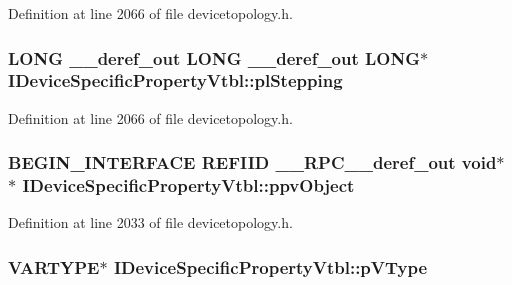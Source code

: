 Definition at line 2066 of file devicetopology.\+h.

\subsubsection[{\texorpdfstring{pl\+Stepping}{plStepping}}]{ L\+O\+NG {\bf \+\_\+\+\_\+deref\+\_\+out} L\+O\+NG {\bf \+\_\+\+\_\+deref\+\_\+out} L\+O\+NG$\ast$ I\+Device\+Specific\+Property\+Vtbl\+::pl\+Stepping}\hypertarget{struct_i_device_specific_property_vtbl_ac5505cba6d33acf434bb675cdc7840ec}{}\label{struct_i_device_specific_property_vtbl_ac5505cba6d33acf434bb675cdc7840ec}


Definition at line 2066 of file devicetopology.\+h.

\subsubsection[{\texorpdfstring{ppv\+Object}{ppvObject}}]{\setlength{\rightskip}{0pt plus 5cm}B\+E\+G\+I\+N\+\_\+\+I\+N\+T\+E\+R\+F\+A\+CE {\bf R\+E\+F\+I\+ID} {\bf \+\_\+\+\_\+\+R\+P\+C\+\_\+\+\_\+deref\+\_\+out} {\bf void}$\ast$$\ast$ I\+Device\+Specific\+Property\+Vtbl\+::ppv\+Object}\hypertarget{struct_i_device_specific_property_vtbl_a8047c290fd471a096e9f2761a630e471}{}\label{struct_i_device_specific_property_vtbl_a8047c290fd471a096e9f2761a630e471}


Definition at line 2033 of file devicetopology.\+h.

\subsubsection[{\texorpdfstring{p\+V\+Type}{pVType}}]{ V\+A\+R\+T\+Y\+PE$\ast$ I\+Device\+Specific\+Property\+Vtbl\+::p\+V\+Type}\hypertarget{struct_i_device_specific_property_vtbl_a7b6fd84fe7db8fcb03ad33e2adb25858}{}\label{struct_i_device_specific_property_vtbl_a7b6fd84fe7db8fcb03ad33e2adb25858}



